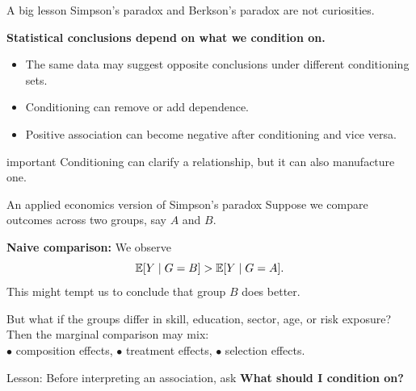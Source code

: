 \documentclass[dvipsnames,aspectratio=169,handout]{beamer}
\begin{document}
\begin{frame}{A big lesson}
Simpson's paradox and Berkson's paradox are not curiosities.

\medskip

\begin{center}
\Large \textbf{Statistical conclusions depend on what we condition on.}
\end{center}

\medskip

\begin{itemize}
    \item The same data may suggest opposite conclusions under different conditioning sets.
    \item Conditioning can remove or add dependence.
    \item Positive association can become negative after conditioning and vice versa.
\end{itemize}

\vspace{2mm}

\begin{beamercolorbox}[wd=\textwidth,sep=7pt,center,rounded=true,shadow=true]{important}
Conditioning can clarify a relationship, but it can also manufacture one.
\end{beamercolorbox}
\end{frame}

\begin{frame}{An applied economics version of Simpson's paradox}
Suppose we compare outcomes across two groups, say $A$ and $B$.

\begin{block}{}
\textbf{Naive comparison:} We observe
\[
\mathbb{E}[Y\mid G=B]>\mathbb{E}[Y\mid G=A].
\]
This might tempt us to conclude that group $B$ does better.
\end{block}

\begin{alertblock}{But what if the groups differ in skill, education, sector, age, or risk exposure?}
Then the marginal comparison may mix:\\[2mm]
\qquad $\bullet$ composition effects, \qquad $\bullet$ treatment effects, \qquad $\bullet$ selection effects.
\end{alertblock}

\begin{block}{Lesson: Before interpreting an association, ask}
\qquad \qquad \qquad \qquad \qquad \qquad \textbf{What should I condition on?}\\[1mm]
\end{block}
\end{frame}
\end{document}
